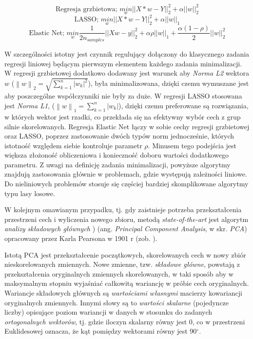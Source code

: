 \begin{equation}
\textrm{Regresja grzbietowa; } \underset{w}{min} ||X*w-Y||_2^2 + \alpha ||w||_2^2
\label{equ:ridgeReg}
\end{equation}
\begin{equation}
\textrm{LASSO; } \underset{w}{min} ||X*w-Y||_2^2 + \alpha ||w||_1
\label{equ:lassoReg}
\end{equation}
\begin{equation}
\textrm{Elastic Net; } \underset{w}{min} { \frac{1}{2n_{samples}} ||X w - y||_2 ^ 2 + \alpha \rho ||w||_1 + \frac{\alpha(1-\rho)}{2} ||w||_2 ^ 2}
\label{equ:elasticNet}
\end{equation}

W szczególności istotny jest czynnik regulujący dołączony do klasycznego zadania regresji liniowej będącym pierwszym elementem każdego zadania minimalizacji. W regresji grzbietowej dodatkowo dodawany jest warunek aby \textit{Norma L2} wektora $w$ ($\left \| w \right \|_2 =\sqrt{ \sum_{k=1}^{n}\left |w_k  \right |^2}$), była minimalizowana, dzięki czemu wymuszane jest aby poszczególne współczynniki nie były za duże. W regresji LASSO stosowana jest \textit{Norma L1}, ($\left \| w \right \|_1 = \sum_{k=1}^{n}\left |w_k  \right |$), dzięki czemu preferowane są rozwiązania, w których wektor jest rzadki, co przekłada się na efektywny wybór cech z grup silnie skorelowanych. Regresja Elastic Net łączy w sobie cechy regresji grzbietowej oraz LASSO, poprzez zastosowanie dwóch typów norm jednocześnie, których istotność względem siebie kontroluje parametr $\rho$. Minusem tego podejścia jest większa złożoność obliczeniowa i konieczność doboru wartości dodatkowego parametru. Z uwagi na definicję zadania minimalizacji, powyższe algorytmy znajdują zastosowania głównie w problemach, gdzie występują zależności liniowe. Do nieliniowych problemów stosuje się częściej bardziej skomplikowane algorytmy typu lasy losowe.

W kolejnym omawianym przypadku, tj. gdy zaistnieje potrzeba przekształcenia przestrzeni cech i wyliczenia nowego zbioru, metodą \textit{state-of-the-art} jest algorytm \textit{analizy składowych głównych} ) (ang. \textit{Principal Component Analysis}, w skr. \textit{PCA}) opracowany przez Karla Pearsona w 1901 r (zob. \cite{PCA}).  

Istotą PCA jest przekształcenie początkowych, skorelowanych cech w nowy zbiór nieskorelowanych zmiennych. Nowe zmienne, tzw. \textit{składowe główne}, powstają z przekształcenia oryginalnych zmiennych skorelowanych, w taki sposób aby w maksymalnym stopniu wyjaśniać całkowitą wariancję w próbie cech oryginalnych. Wariancje składowych głównych są \textit{wartościami własnymi} macierzy kowariancji oryginalnych zmiennych. Innymi słowy są to \textit{wartości skalarne} (pojedyncze liczby) opisujące poziom wariancji w danych w stosunku do zadanych \textit{ortogonalnych wektorów}, tj. gdzie iloczyn skalarny równy jest 0, co w przestrzeni Euklidesowej oznacza, że kąt pomiędzy wektorami równy jest 90$^\circ$.

